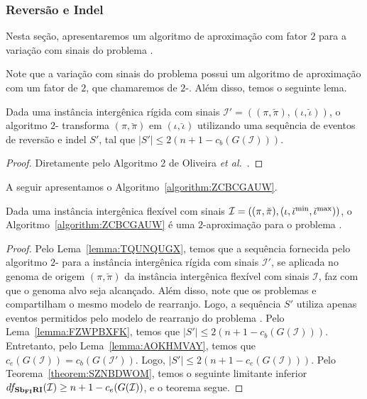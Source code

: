 \subsubsection{Reversão e Indel}

Nesta seção, apresentaremos um algoritmo de aproximação com fator $2$ para a variação com sinais do problema \SbFIRI{}. 

Note que a variação com sinais do problema \SbIRI{} possui um algoritmo de aproximação com um fator de $2$, que chamaremos de $2$-\SbIRI{}. Além disso, temos o seguinte lema.

\begin{lemma}\label{lemma:FZWPBXFK}
Dada uma instância intergênica rígida com sinais $\mathcal{I}'=((\pi,\breve\pi),(\iota,\breve\iota))$, o algoritmo $2$-\SbIRI{} transforma $(\pi,\breve\pi)$ em $(\iota,\breve\iota)$ utilizando uma sequência de eventos de reversão e indel $S'$, tal que $|S'| \le 2({n+1} - c_b(G(\mathcal{I})))$.
\end{lemma}
\begin{proof}
Diretamente pelo Algoritmo 2 de Oliveira \textit{et al.}~\cite{2021b-oliveira-etal}.
\end{proof}

A seguir apresentamos o Algoritmo~\ref{algorithm:ZCBCGAUW}.



\begin{theorem}\label{theorem:UEOFTCVZ}
Dada uma instância intergênica flexível com sinais $\mathcal{I} = ((\pi,\breve\pi),(\iota,\breve\iota^{\min},\break\breve\iota^{\max}))$, o Algoritmo~\ref{algorithm:ZCBCGAUW} é uma $2$-aproximação para o problema \SbFIRI{}.
\end{theorem}
\begin{proof}
Pelo Lema~\ref{lemma:TQUNQUGX}, temos que a sequência fornecida pelo algoritmo $2$-\SbIRI{} para a instância intergênica rígida com sinais $\mathcal{I'}$, se aplicada no genoma de origem $(\pi,\breve\pi)$ da instância intergênica flexível com sinais $\mathcal{I}$, faz com que o genoma alvo seja alcançado. Além disso, note que os problemas \SbIRI{} e \SbFIRI{} compartilham o mesmo modelo de rearranjo. Logo, a sequência $S'$ utiliza apenas eventos permitidos pelo modelo de rearranjo do problema \SbFIRI{}. Pelo Lema~\ref{lemma:FZWPBXFK}, temos que $|S'| \le 2({n+1} - c_b(G(\mathcal{I})))$. Entretanto, pelo Lema~\ref{lemma:AOKHMVAY}, temos que $c_e(G(\mathcal{I})) = c_b(G(\mathcal{I}'))$. Logo, $|S'| \le 2({n+1} - c_e(G(\mathcal{I})))$. Pelo Teorema~\ref{theorem:SZNBDWOM}, temos o seguinte limitante inferior $df_{\textbf{Sb\textsubscript{FI}RI}}(\mathcal{I}) \ge {n+1} - c_e(G(\mathcal{I}))$, e o teorema segue.
\end{proof}

